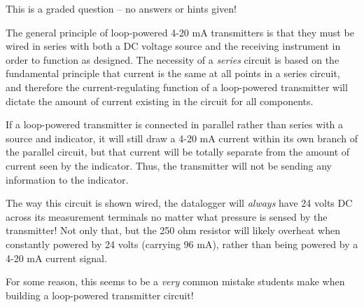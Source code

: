 
This is a graded question -- no answers or hints given!







The general principle of loop-powered 4-20 mA transmitters is that they must be wired in series with both a DC voltage source and the receiving instrument in order to function as designed.  The necessity of a {\it series} circuit is based on the fundamental principle that current is the same at all points in a series circuit, and therefore the current-regulating function of a loop-powered transmitter will dictate the amount of current existing in the circuit for all components.

If a loop-powered transmitter is connected in parallel rather than series with a source and indicator, it will still draw a 4-20 mA current within its own branch of the parallel circuit, but that current will be totally separate from the amount of current seen by the indicator.  Thus, the transmitter will not be sending any information to the indicator.

\vskip 10pt

The way this circuit is shown wired, the datalogger will {\it always} have 24 volts DC across its measurement terminals no matter what pressure is sensed by the transmitter!  Not only that, but the 250 ohm resistor will likely overheat when constantly powered by 24 volts (carrying 96 mA), rather than being powered by a 4-20 mA current signal.

\vskip 10pt

For some reason, this seems to be a {\it very} common mistake students make when building a loop-powered transmitter circuit!




